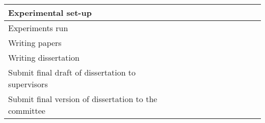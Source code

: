 \documentclass[authoryear,11pt]{elsarticle}
\begin{document}
\begin{table}[h!]
\begin{tabular}{|p{8cm}|c|c|c|c|c|c|c|c|c|c|c|c|}
		\hline
		Experimental set-up &\cellcolor{blue}&\cellcolor{blue}&&&\cellcolor[gray]{0.9}&&&
		\cellcolor[gray]{0.9}&&&&\\
		\hline
		Experiments run &&&\cellcolor{blue}&&&\cellcolor[gray]{0.9}&&&\cellcolor[gray]{0.9}&&&\\
		\hline
		Writing papers &\cellcolor{blue}&&\cellcolor{blue}&&\cellcolor[gray]{0.9}&&\cellcolor[gray]{0.9}&&
		\cellcolor[gray]{0.9}&&&\\
		\hline
		Writing dissertation &&&&\cellcolor[gray]{0.9}&\cellcolor[gray]{0.9}&\cellcolor[gray]{0.9}&
		\cellcolor[gray]{0.9}&\cellcolor[gray]{0.9}&\cellcolor[gray]{0.9}&&&\\
		\hline
		Submit final draft of dissertation to supervisors &&&&&&&&&&\cellcolor[gray]{0.9}&&\\
		\hline
		Submit final version of dissertation to the committee &&&&&&&&&&&\cellcolor[gray]{0.9}&\\
		\hline
		
 	\end{tabular}             
 \end{table}
 
	  	
\end{document}
